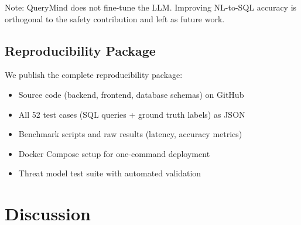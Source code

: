 \documentclass[conference]{IEEEtran}
\begin{document}
Note: QueryMind does not fine-tune the LLM. Improving NL-to-SQL accuracy is orthogonal to the safety contribution and left as future work.

\subsection{Reproducibility Package}
We publish the complete reproducibility package:
\begin{itemize}
  \item Source code (backend, frontend, database schemas) on GitHub
  \item All 52 test cases (SQL queries + ground truth labels) as JSON
  \item Benchmark scripts and raw results (latency, accuracy metrics)
  \item Docker Compose setup for one-command deployment
  \item Threat model test suite with automated validation
\end{itemize}

\section{Discussion}
\end{document}
